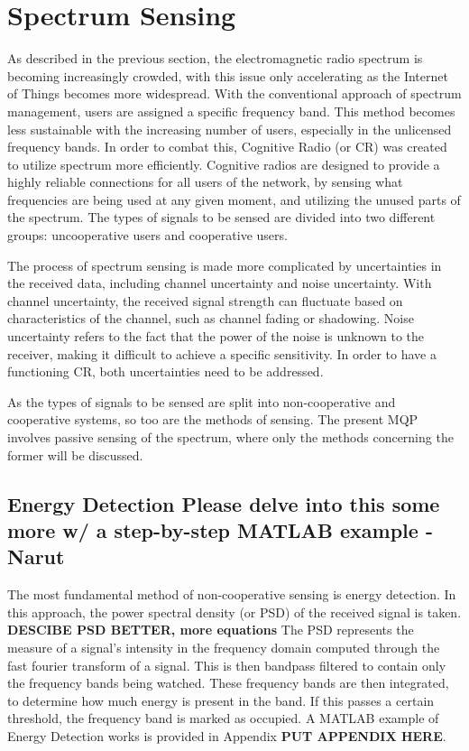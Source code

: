 \section{Spectrum Sensing}
As described in the previous section, the electromagnetic radio spectrum is becoming increasingly crowded, with this issue only accelerating as the Internet of Things becomes more widespread\cite{sensing_iot}. With the conventional approach of spectrum management, users are assigned a specific frequency band. This method becomes less sustainable with the increasing number of users, especially in the unlicensed frequency bands. In order to combat this, Cognitive Radio (or CR) was created to utilize spectrum more efficiently\cite{wyglinski_book}. Cognitive radios are designed to provide a highly reliable connections for all users of the network, by sensing what frequencies are being used at any given moment, and utilizing the unused parts of the spectrum. The types of signals to be sensed are divided into two different groups: uncooperative users and cooperative users\cite{spectrum_sense_methods}. \par
The process of spectrum sensing is made more complicated by uncertainties in the received data, including channel uncertainty and noise uncertainty. With channel uncertainty, the received signal strength can fluctuate based on characteristics of the channel, such as channel fading or shadowing. Noise uncertainty refers to the fact that the power of the noise is unknown to the receiver, making it difficult to achieve a specific sensitivity\cite{spectrum_sense_methods}. In order to have a functioning CR, both uncertainties need to be addressed. \par
As the types of signals to be sensed are split into non-cooperative and cooperative systems, so too are the methods of sensing. The present MQP involves passive sensing of the spectrum, where only the methods concerning the former will be discussed.

\subsection{Energy Detection \textbf{Please delve into this some more w/ a step-by-step MATLAB example -Narut}}
The most fundamental method of non-cooperative sensing is energy detection. In this approach, the power spectral density (or PSD) of the received signal is taken\cite{sensing_energy}. \textbf{DESCIBE PSD BETTER, more equations} The PSD represents the measure of a signal’s intensity in the frequency domain computed through the fast fourier transform of a signal. This is then bandpass filtered to contain only the frequency bands being watched. These frequency bands are then integrated, to determine how much energy is present in the band. If this passes a certain threshold, the frequency band is marked as occupied. A MATLAB example of Energy Detection works is provided in Appendix \textbf{PUT APPENDIX HERE}.

